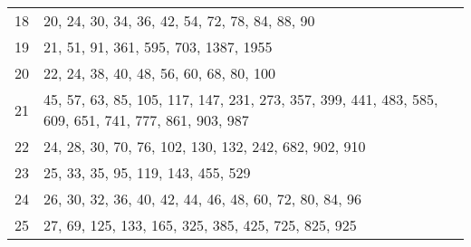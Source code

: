 \documentclass[12pt]{article}
\begin{document}
\begin{tabular}{|r|l|}
18 & 20, 24, 30, 34, 36, 42, 54, 72, 78, 84, 88, 90 \\
19 & 21, 51, 91, 361, 595, 703, 1387, 1955 \\
20 & 22, 24, 38, 40, 48, 56, 60, 68, 80, 100 \\
21 & 45, 57, 63, 85, 105, 117, 147, 231, 273, 357, 399, 441, 483, 585, 609, 651, 741, 777, 861, 903, 987 \\
22 & 24, 28, 30, 70, 76, 102, 130, 132, 242, 682, 902, 910 \\
23 & 25, 33, 35, 95, 119, 143, 455, 529 \\
24 & 26, 30, 32, 36, 40, 42, 44, 46, 48, 60, 72, 80, 84, 96 \\
25 & 27, 69, 125, 133, 165, 325, 385, 425, 725, 825, 925 \\
\end{tabular}

\end{document}
